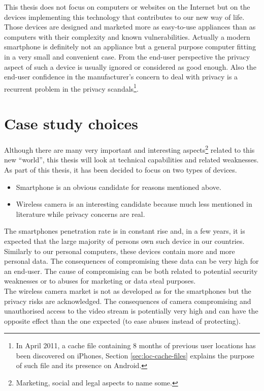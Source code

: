 This thesis does not focus on computers or websites on the Internet but on the devices implementing this technology that contributes to our new way of life.
Those devices are designed and marketed more as easy-to-use appliances than as computers with their complexity and known vulnerabilities.
Actually a modern smartphone is definitely not an appliance but a general purpose computer fitting in a very small and convenient case.
From the end-user perspective the privacy aspect of such a device is usually ignored or considered as good enough.
Also the end-user confidence in the manufacturer’s concern to deal with privacy is a recurrent problem in the privacy scandals\footnote{In April 2011, a cache file containing 8 months of previous user locations has been discovered on iPhones, Section \ref{sec:loc-cache-files} explains the purpose of such file and its presence on Android.}.

\section{Case study choices}

Although there are many very important and interesting aspects\footnote{Marketing, social and legal aspects to name some.} related to this new ``world'', this thesis will look at technical capabilities and related weaknesses.
As part of this thesis, it has been decided to focus on two types of devices.
\begin{itemize}
\item Smartphone is an obvious candidate for reasons mentioned above.
\item Wireless camera is an interesting candidate because much less mentioned in literature while privacy concerns are real.
\end{itemize}

The smartphones penetration rate is in constant rise and, in a few years, it is expected that the large majority of persons own such device in our countries.
Similarly to our personal computers, these devices contain more and more personal data.
The consequences of compromising these data can be very high for an end-user.
The cause of compromising can be both related to potential security weaknesses or to abuses for marketing or data steal purposes.\\

The wireless camera market is not as developed as for the smartphones but the privacy risks are acknowledged.
The consequences of camera compromising and unauthorised access to the video stream is potentially very high and can have the opposite effect than the one expected (to ease abuses instead of protecting).\\

